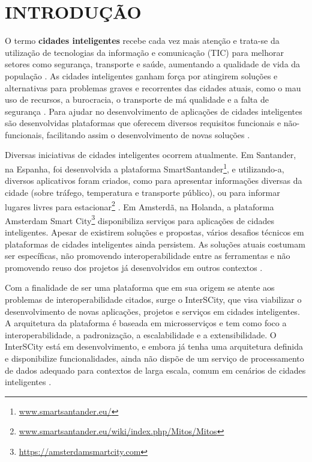 \chapter[INTRODUÇÃO]{INTRODUÇÃO}
\label{chapter:intro}

O termo \textbf{cidades inteligentes} recebe cada vez mais atenção e trata-se
da utilização de tecnologias da informação e comunicação (TIC) para melhorar
setores como segurança, transporte e saúde, aumentando a qualidade de vida
da população \cite{batty2012smart}. As cidades inteligentes ganham força por
atingirem soluções e alternativas para problemas graves e recorrentes
das cidades atuais, como o mau uso de recursos, a burocracia, o transporte de má
qualidade e a falta de segurança \cite{batty2012smart}. Para ajudar no
desenvolvimento de aplicações de cidades inteligentes são desenvolvidas
plataformas que oferecem diversos requisitos funcionais e não-funcionais,
facilitando assim o desenvolvimento de novas soluções \cite{kon2016}.

Diversas iniciativas de cidades inteligentes ocorrem atualmente. Em Santander,
na Espanha, foi desenvolvida a plataforma
SmartSantander\footnote{\url{www.smartsantander.eu/}}, e utilizando-a,
diversos aplicativos foram criados, como para apresentar informações diversas
da cidade (sobre tráfego, temperatura e transporte público), ou para informar
lugares livres para
estacionar\footnote{\url{www.smartsantander.eu/wiki/index.php/Mitos/Mitos}}
\cite{gutierrez2013}. Em Amsterdã, na Holanda, a plataforma Amsterdam Smart
City\footnote{\url{https://amsterdamsmartcity.com}} disponibiliza serviços para
aplicações de cidades inteligentes. Apesar de existirem soluções
e propostas, vários desafios técnicos em plataformas de cidades inteligentes
ainda persistem. As soluções atuais costumam ser específicas, não promovendo
interoperabilidade entre as ferramentas e não promovendo reuso dos projetos já
desenvolvidos em outros contextos \cite{delesposte2017}.

Com a finalidade de ser uma plataforma que em sua origem se atente aos
problemas de interoperabilidade citados, surge o InterSCity, que visa
viabilizar o desenvolvimento de novas aplicações, projetos e serviços em cidades
inteligentes. A arquitetura da plataforma é baseada em microsserviços e
tem como foco a interoperabilidade, a padronização, a escalabilidade e
a extensibilidade. O InterSCity está em desenvolvimento, e embora já tenha uma
arquitetura definida e disponibilize funcionalidades, ainda não dispõe
de um serviço de processamento de dados adequado para contextos de larga
escala, comum em cenários de cidades inteligentes \cite{alnuaimi2015}.

